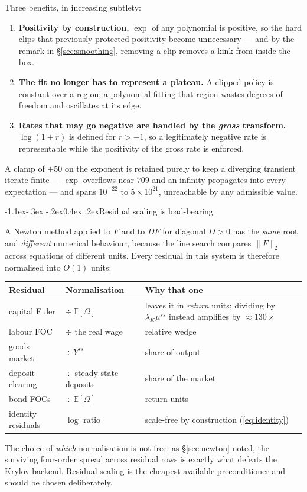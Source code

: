 \documentclass[10pt,a4paper]{article}
\makeatletter
\theoremstyle{definition}
\theoremstyle{plain}
\theoremstyle{remark}
\newcommand{\E}{\mathbb{E}}
\renewcommand\subsection{\@startsection{subsection}{2}{\z@}%
  {-1.1ex\@plus -.3ex \@minus -.2ex}{0.4ex \@plus .2ex}{\normalfont\normalsize\bfseries}}
\makeatother
\begin{document}
Three benefits, in increasing subtlety:
\begin{enumerate}
\item \textbf{Positivity by construction.} $\exp$ of any polynomial is positive, so the hard
clips that previously protected positivity become unnecessary --- and by the remark in
\S\ref{sec:smoothing}, removing a clip removes a kink from inside the box.
\item \textbf{The fit no longer has to represent a plateau.} A clipped policy is constant over
a region; a polynomial fitting that region wastes degrees of freedom and oscillates at its
edge.
\item \textbf{Rates that may go negative are handled by the \emph{gross} transform.} $\log(1+r)$
is defined for $r>-1$, so a legitimately negative rate is representable while the positivity
of the gross rate is enforced.
\end{enumerate}
A clamp of $\pm50$ on the exponent is retained purely to keep a diverging transient iterate
finite --- $\exp$ overflows near $709$ and an infinity propagates into every expectation ---
and spans $10^{-22}$ to $5\times10^{21}$, unreachable by any admissible value.

\subsection{Residual scaling is load-bearing}

A Newton method applied to $F$ and to $DF$ for diagonal $D>0$ has the \emph{same} root and
\emph{different} numerical behaviour, because the line search compares
$\|F\|_2$ across equations of different units. Every residual in this system is therefore
normalised into $O(1)$ units:
\begin{center}\small
\begin{tabular}{@{}llp{}@{}}
\toprule
\textbf{Residual} & \textbf{Normalisation} & \textbf{Why that one} \\
\midrule
capital Euler & $\div\,\E[\Omega]$ & leaves it in \emph{return} units; dividing by
$\lambda_K\mu^{ss}$ instead amplifies by $\approx130\times$ \\
labour FOC & $\div$ the real wage & relative wedge \\
goods market & $\div\,Y^{ss}$ & share of output \\
deposit clearing & $\div$ steady-state deposits & share of the market \\
bond FOCs & $\div\,\E[\Omega]$ & return units \\
identity residuals & $\log$ ratio & scale-free by construction (\eqref{eq:identity}) \\
\bottomrule
\end{tabular}
\end{center}
\noindent The choice of \emph{which} normalisation is not free: as \S\ref{sec:newton} noted,
the surviving four-order spread across residual rows is exactly what defeats the Krylov
backend. Residual scaling is the cheapest available preconditioner and should be chosen
deliberately.
\end{document}
